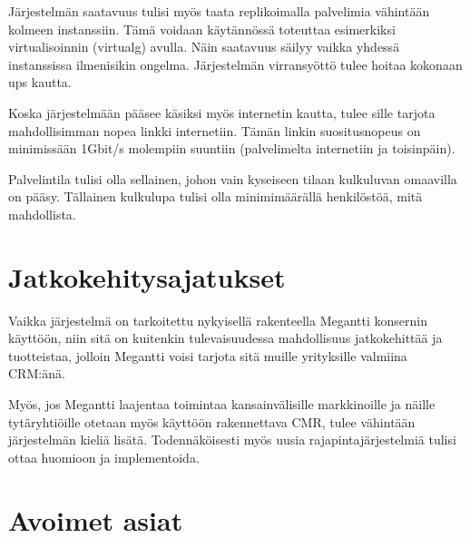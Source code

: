         Järjestelmän saatavuus tulisi myös taata replikoimalla palvelimia vähintään kolmeen instanssiin. Tämä voidaan käytännössä toteuttaa esimerkiksi virtualisoinnin (\gls{virtualg}) avulla. Näin saatavuus säilyy vaikka yhdessä instanssissa ilmenisikin ongelma. Järjestelmän virransyöttö tulee hoitaa kokonaan \gls{ups} kautta. 

        Koska järjestelmään pääsee käsiksi myös internetin kautta, tulee sille tarjota mahdollisimman nopea linkki internetiin. Tämän linkin suositusnopeus on minimissään 1Gbit/s molempiin suuntiin (palvelimelta internetiin ja toisinpäin). 

        Palvelintila tulisi olla sellainen, johon vain kyseiseen tilaan kulkuluvan omaavilla on pääsy. Tällainen kulkulupa tulisi olla minimimäärällä henkilöstöä, mitä mahdollista. 


\section{Jatkokehitysajatukset}     %

    Vaikka järjestelmä on tarkoitettu nykyisellä rakenteella Megantti konsernin käyttöön, niin sitä on kuitenkin tulevaisuudessa
    mahdollisuus jatkokehittää ja tuotteistaa, jolloin Megantti voisi tarjota sitä muille yrityksille valmiina CRM:änä.

    Myös, jos Megantti laajentaa toimintaa kansainvälisille markkinoille ja näille tytäryhtiöille otetaan myös käyttöön rakennettava
    CMR, tulee vähintään järjestelmän kieliä lisätä. Todennäköisesti myös uusia rajapintajärjestelmiä tulisi ottaa huomioon ja implementoida.


\section{Avoimet asiat}     %



   
